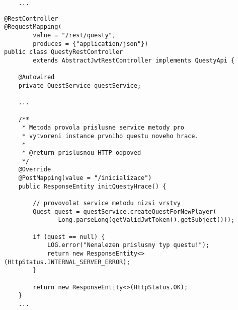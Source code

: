 \documentclass[twoside, 12pt]{article}
\begin{document}
{{\begin{lstlisting}
    ...

\end{lstlisting}

\clearpage


\begin{lstlisting}
@RestController
@RequestMapping(
        value = "/rest/questy",
        produces = {"application/json"})
public class QuestyRestController
        extends AbstractJwtRestController implements QuestyApi {

    @Autowired
    private QuestService questService;

    ...

    /**
     * Metoda provola prislusne service metody pro
     * vytvoreni instance prvniho questu noveho hrace.
     *
     * @return prislusnou HTTP odpoved
     */
    @Override
    @PostMapping(value = "/inicializace")
    public ResponseEntity initQuestyHrace() {

        // provovolat service metodu nizsi vrstvy
        Quest quest = questService.createQuestForNewPlayer(
               Long.parseLong(getValidJwtToken().getSubject()));

        if (quest == null) {
            LOG.error("Nenalezen prislusny typ questu!");
            return new ResponseEntity<>(HttpStatus.INTERNAL_SERVER_ERROR);
        }

        return new ResponseEntity<>(HttpStatus.OK);
    }
    ...

\end{lstlisting}

\clearpage


\vspace{10}



\vspace{10}


\vspace{10}



}}
\end{document}
